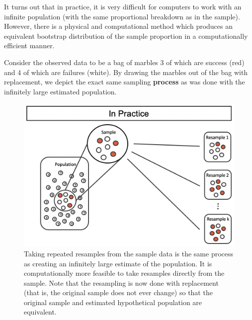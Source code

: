 \documentclass[
  10pt,
  openany]{book}
\begin{document}
It turns out that in practice, it is very difficult for computers to work with an infinite population (with the same proportional breakdown as in the sample).
However, there is a physical and computational method which produces an equivalent bootstrap distribution of the sample proportion in a computationally efficient manner.

Consider the observed data to be a bag of marbles 3 of which are success (red) and 4 of which are failures (white).
By drawing the marbles out of the bag with replacement, we depict the exact same sampling \textbf{process} as was done with the infinitely large estimated population.

\begin{figure}[h]

{\centering \includegraphics[width=0.75\linewidth]{images/boot1prop4} 

}

\caption{Taking repeated resamples from the sample data is the same process as creating an infinitely large estimate of the population.  It is computationally more feasible to take resamples directly from the sample.  Note that the resampling is now done with replacement (that is, the original sample does not ever change) so that the original sample and estimated hypothetical population are equivalent.}\label{fig:boot4}
\end{figure}
\end{document}
